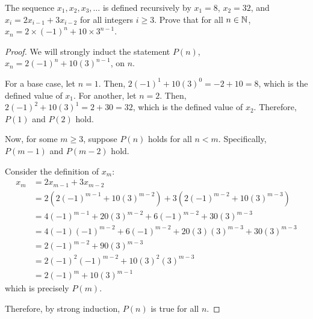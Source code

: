 \documentclass{agony}
\begin{document}
\question The sequence $x_1, x_2, x_3, \dots$ is defined recursively by
$x_1=8$, $x_2=32$, and $x_i = 2x_{i-1} + 3x_{i-2}$ for all integers $i \geq 3$.
Prove that for all $n\in\mathbb{N}$, $x_n = 2 \times (-1)^n + 10 \times 3^{n-1}$.
\begin{proof}
  We will strongly induct the statement $P(n)$, $x_n = 2(-1)^n + 10(3)^{n-1}$, on $n$.

  For a base case, let $n = 1$.
  Then, $2(-1)^1 + 10(3)^0 = -2+10 = 8$, which is the defined value of $x_1$.
  For another, let $n = 2$.
  Then, $2(-1)^2 + 10(3)^1 = 2+30 = 32$, which is the defined value of $x_2$.
  Therefore, $P(1)$ and $P(2)$ hold.

  Now, for some $m \geq 3$, suppose $P(n)$ holds for all $n < m$.
  Specifically, $P(m-1)$ and $P(m-2)$ hold.

  Consider the definition of $x_m$:
  \begin{align*}
    x_m & = 2x_{m-1} + 3x_{m-2}                                                                   \\
        & = 2\left( 2(-1)^{m-1} + 10(3)^{m-2} \right) + 3\left( 2(-1)^{m-2} + 10(3)^{m-3} \right) \\
        & = 4(-1)^{m-1} + 20(3)^{m-2} + 6(-1)^{m-2} + 30(3)^{m-3}                                 \\
        & = 4(-1)(-1)^{m-2} + 6(-1)^{m-2} + 20(3)(3)^{m-3}  + 30(3)^{m-3}                         \\
        & = 2(-1)^{m-2} + 90(3)^{m-3}                                                             \\
        & = 2(-1)^2(-1)^{m-2} + 10(3)^2(3)^{m-3}                                                  \\
        & = 2(-1)^m + 10(3)^{m-1}
  \end{align*}
  which is precisely $P(m)$.

  Therefore, by strong induction, $P(n)$ is true for all $n$.
\end{proof}
\end{document}
